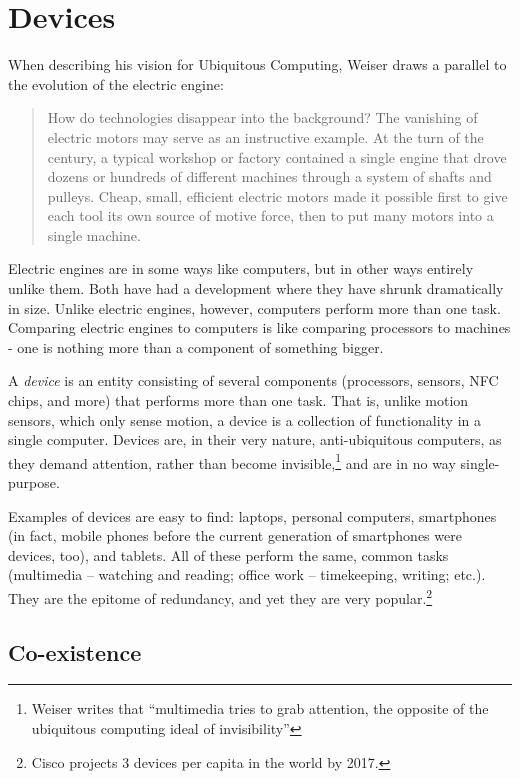 \section{Devices}
\label{sec:devices}

When describing his vision for Ubiquitous Computing, Weiser draws a parallel to the evolution of the electric engine:

\begin{quote}
    How do technologies disappear into the background? The vanishing of electric motors may serve as an instructive example.
    At the turn of the century, a typical workshop or factory contained a single engine that drove dozens or hundreds of
    different machines through a system of shafts and pulleys. Cheap, small, efficient electric motors made it possible first
    to give each tool its own source of motive force, then to put many motors into a single machine.\cite{weiser91}
\end{quote}

Electric engines are in some ways like computers, but in other ways entirely unlike them. Both have had a development where
they have shrunk dramatically in size. Unlike electric engines, however, computers perform more than one task. Comparing electric
engines to computers is like comparing processors to machines - one is nothing more than a component of something bigger.

A \emph{device} is an entity consisting of several components (processors, sensors, NFC chips, and more) that performs more
than one task. That is, unlike motion sensors, which only sense motion, a device is a collection of functionality in a single
computer. Devices are, in their very nature, anti-ubiquitous computers, as they demand attention, rather than become
invisible,\footnote{Weiser writes that ``multimedia tries to grab attention, the opposite of the ubiquitous computing ideal of
invisibility''\cite{weiser93}} and are in no way single-purpose.

Examples of devices are easy to find: laptops, personal computers, smartphones (in fact, mobile phones before the current generation
of smartphones were devices, too), and tablets. All of these perform the same, common
tasks (multimedia -- watching and reading; office work -- timekeeping, writing; etc.). They are the epitome of redundancy, and yet
they are very popular.\footnote{Cisco projects 3 devices per capita in the world by 2017.\cite{cisco}}

\subsection*{Co-existence}

